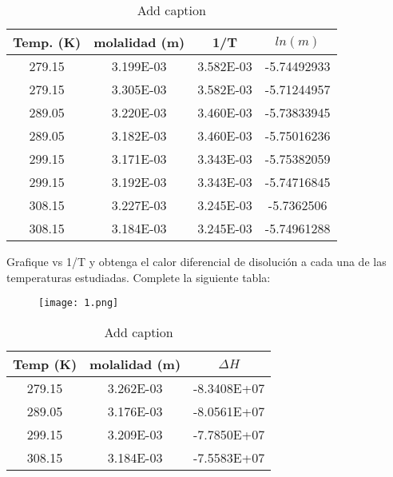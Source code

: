 \documentclass[a4paper,12pt]{article}
\begin{document}
\begin{table}[hbtp]
  \centering
  \caption{Add caption}
    \begin{tabular}{|c|c|c|c|}
    \hline
    Temp. (K) & molalidad (m) & 1/T & $ln(m)$ \bigstrut\\
    \hline
    279.15 & \multicolumn{1}{c|}{3.199E-03} & 3.582E-03 & -5.74492933 \bigstrut[t]\\
    279.15 & \multicolumn{1}{c|}{3.305E-03} & 3.582E-03 & -5.71244957 \\
    289.05 & \multicolumn{1}{c|}{3.220E-03} & 3.460E-03 & -5.73833945 \\
    289.05 & \multicolumn{1}{c|}{3.182E-03} & 3.460E-03 & -5.75016236 \\
    299.15 & \multicolumn{1}{c|}{3.171E-03} & 3.343E-03 & -5.75382059 \\
    299.15 & \multicolumn{1}{c|}{3.192E-03} & 3.343E-03 & -5.74716845 \\
    308.15 & \multicolumn{1}{c|}{3.227E-03} & 3.245E-03 & -5.7362506 \\
    308.15 & \multicolumn{1}{c|}{3.184E-03} & 3.245E-03 & -5.74961288 \bigstrut[b]\\
    \hline
    \end{tabular}%
  \label{tab:addlabel}%
\end{table}%

Grafique vs 1/T y obtenga el calor diferencial de disoluci\'on a cada una de las temperaturas estudiadas. Complete la siguiente tabla:

\begin{figure}[h]
	\centering
	\texttt{[image: 1.png]}
\end{figure}

\begin{table}[htbp]
  \centering
  \caption{Add caption}
    \begin{tabular}{|c|c|c|}
    \hline
    Temp (K) & molalidad (m) & $\Delta H$ \bigstrut\\
    \hline
    279.15 & 3.262E-03 & -8.3408E+07 \bigstrut[t]\\
    289.05 & 3.176E-03 & -8.0561E+07 \\
    299.15 & 3.209E-03 & -7.7850E+07 \\
    308.15 & 3.184E-03 & -7.5583E+07 \bigstrut[b]\\
    \hline
    \end{tabular}%
  \label{tab:addlabel}%
\end{table}%
\end{document}
